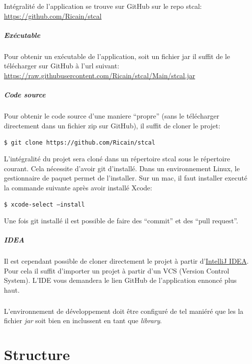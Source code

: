 \documentclass[a4paper,10pt]{report}
\newcommand{\code}[1]{\texttt{#1}}
\begin{document}
			Intégralité de l'application se trouve sur GitHub sur le repo stcal: \href{https://github.com/Ricain/stcal}{https://github.com/Ricain/stcal}
	
			\paragraph[Binaire]{Exécutable}
			Pour obtenir un exécutable de l'application, soit un fichier jar il suffit de le télécharger sur GitHub à l'url suivant: \href{https://raw.githubusercontent.com/Ricain/stcal/Main/stcal.jar}{https://raw.githubusercontent.com/Ricain/stcal/Main/stcal.jar}

			\paragraph[Code source]{Code source}
			Pour obtenir le code source d'une maniere ``propre'' (sans le télécharger directement dans un fichier zip sur GitHub), il suffit de cloner le projet:

			\code{\$ git clone https://github.com/Ricain/stcal}

			L'intégralité du projet sera cloné dans un répertoire stcal sous le répertoire courant. Cela nécessite d'avoir git d'installé. Dans un environnement Linux, le gestionnaire de paquet permet de l'installer. Sur un mac, il faut installer executé la commande suivante après avoir installé Xcode:

			\code{\$ xcode-select --install}

			Une fois git installé il est possible de faire des ``commit'' et des ``pull request''.

			\paragraph[IDEA]{IDEA}
			Il est cependant possible de cloner directement le projet à partir d'\href{http://www.jetbrains.com/idea/}{IntelliJ IDEA}. Pour cela il suffit d'importer un projet à partir d'un VCS (Version Control System). L'IDE vous demandera le lien GitHub de l'application ennoncé plus haut.

			\paragraph*{}
			L’environnement de développement doit être configuré de tel maniéré que les la fichier \textit{jar} soit bien en inclussent en tant que \textit{library}.

\chapter{Structure}
\end{document}
